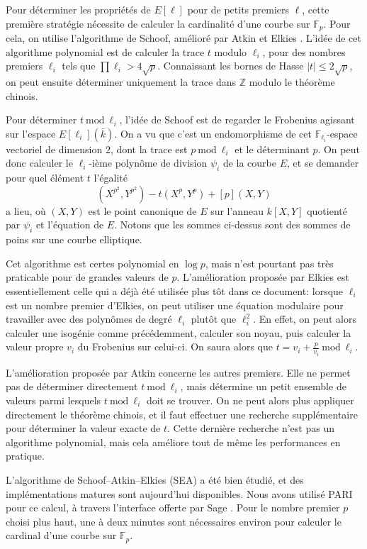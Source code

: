 \documentclass[11pt,a4paper]{article}
\newcommand{\Z}{\mathbb{Z}}
\newcommand{\F}{\mathbb{F}}
\renewcommand{\mod}{\ \mathrm{mod}\ }
\renewcommand{\v}{\vspace{5mm}}
\theoremstyle{definition}
\begin{document}
\v
Pour déterminer les propriétés de $E[\ell]$ pour de petits premiers $\ell$, cette première stratégie nécessite de calculer la cardinalité d'une courbe sur $\F_p$. Pour cela, on utilise l'algorithme de Schoof, amélioré par Atkin et Elkies \cite{Schoof}. L'idée de cet algorithme polynomial est de calculer la trace $t$ modulo $\ell_i$, pour des nombres premiers $\ell_i$ tels que $\prod \ell_i > 4\sqrt{p}$. Connaissant les bornes de Hasse $|t|\leq 2\sqrt{p}$, on peut ensuite déterminer uniquement la trace dans $\Z$ modulo le théorème chinois.

Pour déterminer $t \mod \ell_i$, l'idée de Schoof est de regarder le Frobenius agissant sur l'espace $E[\ell_i](\bar{k})$. On a vu que c'est un endomorphisme de cet $\F_{\ell_i}$-espace vectoriel de dimension 2, dont la trace est $p\mod \ell_i$ et le déterminant $p$. On peut donc calculer le $\ell_i$-ième polynôme de division $\psi_i$ de la courbe $E$, et se demander pour quel élément $t$ l'égalité
$$(X^{p^2}, Y^{p^2}) - t (X^p, Y^p) + [p] (X, Y)$$
a lieu, où $(X, Y)$ est le point canonique de $E$ sur l'anneau $k[X, Y]$ quotienté par $\psi_i$ et l'équation de $E$. Notons que les sommes ci-dessus sont des sommes de poins sur une courbe elliptique. 

Cet algorithme est certes polynomial en $\log p$, mais n'est pourtant pas très praticable pour de grandes valeurs de $p$. L'amélioration proposée par Elkies est essentiellement celle qui a déjà été utilisée plus tôt dans ce document: lorsque $\ell_i$ est un nombre premier d'Elkies, on peut utiliser une équation modulaire pour travailler avec des polynômes de degré $\ell_i$ plutôt que $\ell_i^2$. En effet, on peut alors calculer une isogénie comme précédemment, calculer son noyau, puis calculer la valeur propre $v_i$ du Frobenius sur celui-ci. On saura alors que $t = v_i + \frac{p}{v_i} \mod \ell_i$.

L'amélioration proposée par Atkin concerne les autres premiers. Elle ne permet pas de déterminer directement $t \mod \ell_i$, mais détermine un petit ensemble de valeurs parmi lesquels $t \mod\ell_i$ doit se trouver. On ne peut alors plus appliquer directement le théorème chinois, et il faut effectuer une recherche supplémentaire pour déterminer la valeur exacte de $t$. Cette dernière recherche n'est pas un algorithme polynomial, mais cela améliore tout de même les performances en pratique.

L'algorithme de Schoof--Atkin--Elkies (SEA) a été bien étudié, et des implémentations matures sont aujourd'hui disponibles. Nous avons utilisé PARI \cite{PARI} pour ce calcul, à travers l'interface offerte par Sage \cite{Sage}. Pour le nombre premier $p$ choisi plus haut, une à deux minutes sont nécessaires environ pour calculer le cardinal d'une courbe sur $\F_p$.
\end{document}
